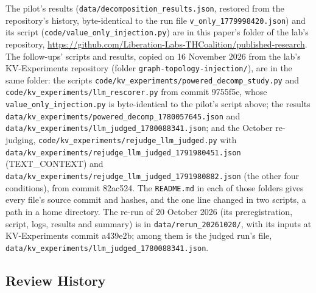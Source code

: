 \documentclass[11pt,a4paper]{article}
\begin{document}
The pilot's results (\nolinkurl{data/decomposition_results.json}, restored from the repository's history, byte-identical to the run file \nolinkurl{v_only_1779998420.json}) and its script (\nolinkurl{code/value_only_injection.py}) are in this paper's folder of the lab's repository, \url{https://github.com/Liberation-Labs-THCoalition/published-research}. The follow-ups' scripts and results, copied on 16 November 2026 from the lab's KV-Experiments repository (folder \nolinkurl{graph-topology-injection/}), are in the same folder: the scripts \nolinkurl{code/kv_experiments/powered_decomp_study.py} and \nolinkurl{code/kv_experiments/llm_rescorer.py} from commit 9755f5e, whose \nolinkurl{value_only_injection.py} is byte-identical to the pilot's script above; the results \nolinkurl{data/kv_experiments/powered_decomp_1780057645.json} and \nolinkurl{data/kv_experiments/llm_judged_1780088341.json}; and the October re-judging, \nolinkurl{code/kv_experiments/rejudge_llm_judged.py} with \nolinkurl{data/kv_experiments/rejudge_llm_judged_1791980451.json} (TEXT\_CONTEXT) and \nolinkurl{data/kv_experiments/rejudge_llm_judged_1791980882.json} (the other four conditions), from commit 82ac524. The \nolinkurl{README.md} in each of those folders gives every file's source commit and hashes, and the one line changed in two scripts, a path in a home directory. The re-run of 20 October 2026 (its preregistration, script, logs, results and summary) is in \nolinkurl{data/rerun_20261020/}, with its inputs at KV-Experiments commit a439e2b; among them is the judged run's file, \nolinkurl{data/kv_experiments/llm_judged_1780088341.json}.

\subsection*{Review History}
\end{document}
